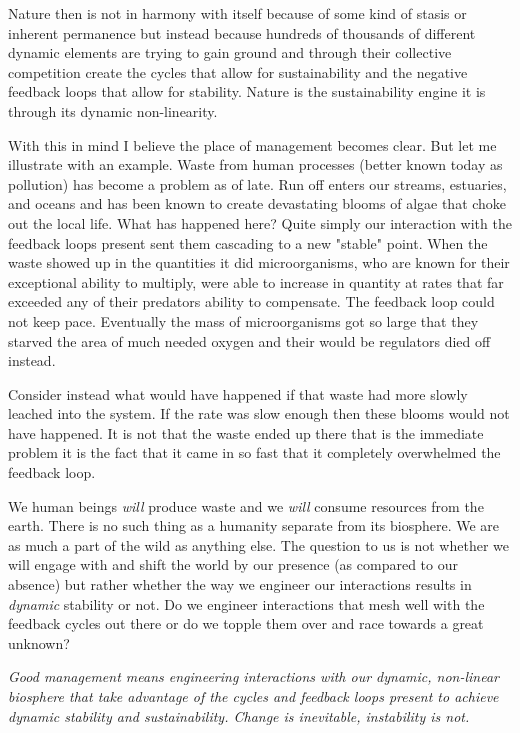 \documentclass[11pt,a5paper]{article}
\begin{document}
Nature then is not in harmony with itself because of some kind of stasis or inherent permanence but instead because hundreds of thousands of different dynamic elements are trying to gain ground and through their collective competition create the cycles that allow for sustainability and the negative feedback loops that allow for stability. Nature is the sustainability engine it is through its dynamic non-linearity. \newline

With this in mind I believe the place of management becomes clear. But let me illustrate with an example. Waste from human processes (better known today as pollution) has become a problem as of late. Run off enters our streams, estuaries, and oceans and has been known to create devastating blooms of algae that choke out the local life. What has happened here? Quite simply our interaction with the feedback loops present sent them cascading to a new "stable" point. When the waste showed up in the quantities it did microorganisms, who are known for their exceptional ability to multiply, were able to increase in quantity at rates that far exceeded any of their predators ability to compensate. The feedback loop could not keep pace. Eventually the mass of microorganisms got so large that they starved the area of much needed oxygen and their would be regulators died off instead.  

Consider instead what would have happened if that waste had more slowly leached into the system. If the rate was slow enough then these blooms would not have happened. It is not that the waste ended up there that is the immediate problem it is the fact that it came in so fast that it completely overwhelmed the feedback loop. 

We human beings \textit{will} produce waste and we \textit{will} consume resources from the earth. There is no such thing as a humanity separate from its biosphere. We are as much a part of the wild as anything else. The question to us is not whether we will engage with and shift the world by our presence (as compared to our absence) but rather whether the way we engineer our interactions results in \textit{dynamic} stability or not. Do we engineer interactions that mesh well with the feedback cycles out there or do we topple them over and race towards a great unknown? \newline 

\textit{Good management means engineering interactions with our dynamic, non-linear biosphere that take advantage of the cycles and feedback loops present to achieve dynamic stability and sustainability. Change is inevitable, instability is not.} \newline 
\end{document}
